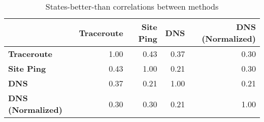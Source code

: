 \begin{table}[htb]
    \centering
    \begin{tabular}{lrrrr}
    \toprule
    {} & \textbf{Traceroute} & \textbf{Site Ping} & \textbf{DNS} &  \textbf{DNS (Normalized)} \\
    \midrule
    \textbf{Traceroute} &   1.00 &     0.43 &  0.37 &      0.30 \\
    \textbf{Site Ping} &  0.43 &      1.00 & 0.21 &       0.30 \\
    \textbf{DNS} &   0.37 &     0.21 &  1.00 &      0.21 \\
    \textbf{DNS (Normalized)} &  0.30 &      0.30 & 0.21 &       1.00 \\
    \bottomrule
    \end{tabular}
    \caption{States-better-than correlations between methods}
    \label{tab:states_better_than_correlation}
\end{table}